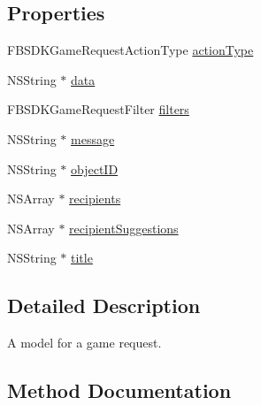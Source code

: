 \subsection*{Properties}
\begin{DoxyCompactItemize}
\item 
F\+B\+S\+D\+K\+Game\+Request\+Action\+Type \hyperlink{interface_f_b_s_d_k_game_request_content_ac80b1bf36b265614546c38983ea55aa0}{action\+Type}
\item 
N\+S\+String $\ast$ \hyperlink{interface_f_b_s_d_k_game_request_content_a5842159d850c0e701d7753d64e1e22be}{data}
\item 
F\+B\+S\+D\+K\+Game\+Request\+Filter \hyperlink{interface_f_b_s_d_k_game_request_content_ae1268dd62ab78042145dd25bc4ef8961}{filters}
\item 
N\+S\+String $\ast$ \hyperlink{interface_f_b_s_d_k_game_request_content_a88accc7b486e626dae7d08e744a9af66}{message}
\item 
N\+S\+String $\ast$ \hyperlink{interface_f_b_s_d_k_game_request_content_a3ea25b3469e4471f3cde2d36fba75127}{object\+I\+D}
\item 
N\+S\+Array $\ast$ \hyperlink{interface_f_b_s_d_k_game_request_content_a6ffc865399f879ec60e5162e1a6d4fa6}{recipients}
\item 
N\+S\+Array $\ast$ \hyperlink{interface_f_b_s_d_k_game_request_content_aef74918f18e3c07ef21b64b40ed5284e}{recipient\+Suggestions}
\item 
N\+S\+String $\ast$ \hyperlink{interface_f_b_s_d_k_game_request_content_ae626589f2d4e7d36444d34a819989cef}{title}
\end{DoxyCompactItemize}


\subsection{Detailed Description}
A model for a game request. 

\subsection{Method Documentation}
\hypertarget{interface_f_b_s_d_k_game_request_content_ab88f3c5b306c53ef92841438098600e0}{}
